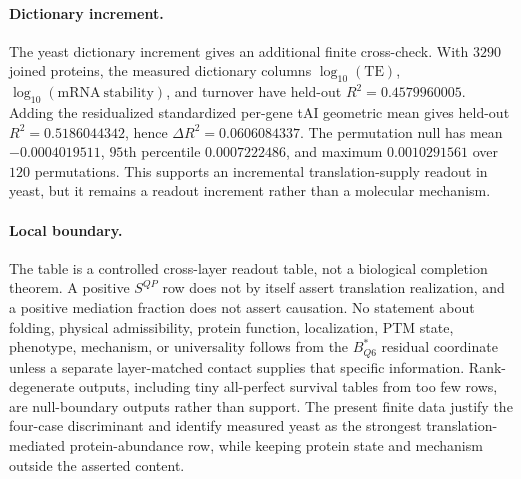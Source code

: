 \paragraph{Dictionary increment.}
The yeast dictionary increment gives an additional finite cross-check. With $3290$ joined proteins, the measured dictionary columns $\log_{10}(\mathrm{TE})$, $\log_{10}(\mathrm{mRNA\ stability})$, and turnover have held-out $R^2=0.4579960005$. Adding the residualized standardized per-gene tAI geometric mean gives held-out $R^2=0.5186044342$, hence $\Delta R^2=0.0606084337$. The permutation null has mean $-0.0004019511$, $95$th percentile $0.0007222486$, and maximum $0.0010291561$ over $120$ permutations. This supports an incremental translation-supply readout in yeast, but it remains a readout increment rather than a molecular mechanism.

\paragraph{Local boundary.}
The table is a controlled cross-layer readout table, not a biological completion theorem. A positive $S^{QP}$ row does not by itself assert translation realization, and a positive mediation fraction does not assert causation. No statement about folding, physical admissibility, protein function, localization, PTM state, phenotype, mechanism, or universality follows from the $B^*_{Q6}$ residual coordinate unless a separate layer-matched contact supplies that specific information. Rank-degenerate outputs, including tiny all-perfect survival tables from too few rows, are null-boundary outputs rather than support. The present finite data justify the four-case discriminant and identify measured yeast as the strongest translation-mediated protein-abundance row, while keeping protein state and mechanism outside the asserted content.

